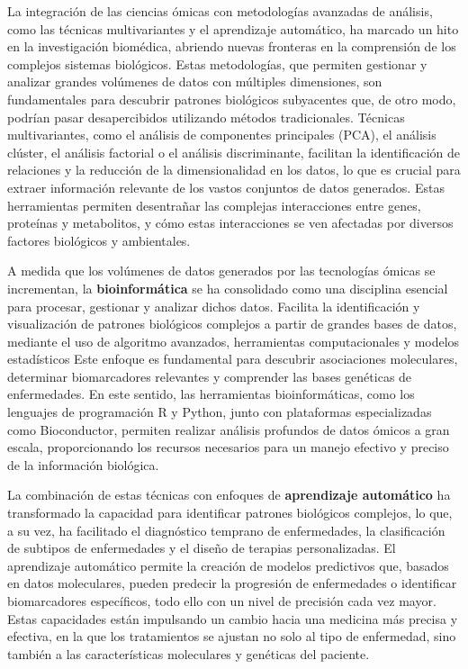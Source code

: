 La integración de las ciencias ómicas con metodologías avanzadas de análisis, como las técnicas multivariantes 
y el aprendizaje automático, ha marcado un hito en la investigación biomédica, abriendo nuevas fronteras en la 
comprensión de los complejos sistemas biológicos. Estas metodologías, que permiten gestionar y analizar grandes 
volúmenes de datos con múltiples dimensiones, son fundamentales para descubrir patrones biológicos subyacentes 
que, de otro modo, podrían pasar desapercibidos utilizando métodos tradicionales. Técnicas multivariantes, como 
el análisis de componentes principales (PCA), el análisis clúster, el análisis factorial o 
el análisis discriminante, facilitan la identificación de relaciones y la reducción de la dimensionalidad en los 
datos, lo que es crucial para extraer información relevante de los vastos conjuntos de datos generados. 
Estas herramientas permiten desentrañar las complejas interacciones entre genes, proteínas y metabolitos, y cómo 
estas interacciones se ven afectadas por diversos factores biológicos y ambientales. \newline

A medida que los volúmenes de datos generados por las tecnologías ómicas se incrementan, la \textbf{bioinformática} se ha 
consolidado como una disciplina esencial para procesar, gestionar y analizar dichos datos. Facilita la identificación y 
visualización de patrones biológicos complejos a partir de grandes bases de datos, mediante el uso de algoritmo avanzados,
herramientas computacionales y modelos estadísticos Este enfoque es fundamental para descubrir asociaciones moleculares, 
determinar biomarcadores relevantes y comprender las bases genéticas de enfermedades. En este sentido, las herramientas
bioinformáticas, como los lenguajes de programación R y Python, junto con plataformas especializadas como Bioconductor, 
permiten realizar análisis profundos de datos ómicos a gran escala, proporcionando los recursos necesarios para un 
manejo efectivo y preciso de la información biológica. \newline

La combinación de estas técnicas con enfoques de \textbf{aprendizaje automático} ha transformado la capacidad 
para identificar patrones biológicos complejos, lo que, a su vez, ha facilitado el diagnóstico temprano de 
enfermedades, la clasificación de subtipos de enfermedades y el diseño de terapias personalizadas. El aprendizaje 
automático permite la creación de modelos predictivos que, basados en datos moleculares, pueden predecir la 
progresión de enfermedades o identificar biomarcadores específicos, todo ello con un nivel de precisión cada vez 
mayor. Estas capacidades están impulsando un cambio hacia una medicina más precisa y efectiva, en la que los 
tratamientos se ajustan no solo al tipo de enfermedad, sino también a las características moleculares y genéticas 
del paciente. \newline

